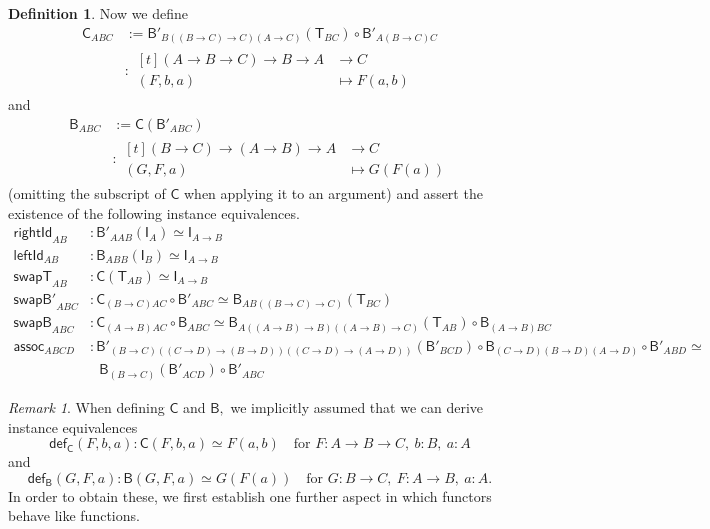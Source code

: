 \documentclass[a4paper]{article}
\theoremstyle{definition}
\newtheorem{definition}{Definition}[section]
\theoremstyle{remark}
\newtheorem*{remark}{Remark}
\renewcommand{\equiv}{\simeq}
\newcommand{\nm}{\mathsf}
\newcommand{\fndef}[1]{\nm{def}_{#1}}
\newcommand{\combinator}{\nm}
\newcommand{\idFun}{\combinator{I}}
\newcommand{\revAppFun}{\combinator{T}}
\newcommand{\compFun}{\combinator{B'}}
\newcommand{\revCompFun}{\combinator{B}}
\newcommand{\swapFun}{\combinator{C}}
\begin{document}
\begin{definition}
  Now we define
  \begin{align*}
    \swapFun_{ABC} &:= \compFun_{B((B{\to}C){\to}C)(A{\to}C)}(\revAppFun_{BC}) \circ \compFun_{A(B{\to}C)C}\\
                   &: \begin{aligned}[t]
                        (A \to B \to C) \to B \to A &\to     C\\
                        (F,b,a)                     &\mapsto F(a,b)
                      \end{aligned}
  \end{align*}
  and
  \begin{align*}
    \revCompFun_{ABC} &:= \swapFun(\compFun_{ABC})\\
                      &: \begin{aligned}[t]
                           (B \to C) \to (A \to B) \to A &\to     C\\
                           (G,F,a)                       &\mapsto G(F(a))
                         \end{aligned}
  \end{align*}
  (omitting the subscript of $\swapFun$ when applying it to an argument)
  and assert the existence of the following instance equivalences.
  \begin{align*}
    \nm{rightId}_{AB} &: \compFun_{AAB}(\idFun_A) \equiv \idFun_{A{\to}B}\\
    \nm{leftId}_{AB}  &: \revCompFun_{ABB}(\idFun_B) \equiv \idFun_{A{\to}B}\\
    \nm{swapT}_{AB}   &: \swapFun(\revAppFun_{AB}) \equiv \idFun_{A{\to}B}\\
    \nm{swapB'}_{ABC} &: \swapFun_{(B{\to}C)AC} \circ \compFun_{ABC} \equiv \revCompFun_{AB((B{\to}C){\to}C)}(\revAppFun_{BC})\\
    \nm{swapB}_{ABC}  &: \swapFun_{(A{\to}B)AC} \circ \revCompFun_{ABC} \equiv \revCompFun_{A((A{\to}B){\to}B)((A{\to}B){\to}C)}(\revAppFun_{AB}) \circ \revCompFun_{(A{\to}B)BC}\\
    \nm{assoc}_{ABCD} &: \compFun_{(B{\to}C)((C{\to}D){\to}(B{\to}D))((C{\to}D){\to}(A{\to}D))}(\compFun_{BCD}) \circ \revCompFun_{(C{\to}D)(B{\to}D)(A{\to}D)} \circ \compFun_{ABD} \equiv\\
                      &\:\ \ \revCompFun_{(B{\to}C)}(\compFun_{ACD}) \circ \compFun_{ABC}
  \end{align*}
\end{definition}

\begin{remark}
  When defining $\swapFun$ and $\revCompFun,$ we implicitly assumed that we can derive
  instance equivalences
  \[\fndef{\swapFun}(F,b,a) : \swapFun(F,b,a) \equiv F(a,b) \quad \text{for } F : A \to B \to C,\ b : B,\ a : A\]
  and
  \[\fndef{\revCompFun}(G,F,a) : \revCompFun(G,F,a) \equiv G(F(a)) \quad \text{for } G : B \to C,\ F : A \to B,\ a : A.\]
  In order to obtain these, we first establish one further aspect in which functors behave like
  functions.
\end{remark}
\end{document}
